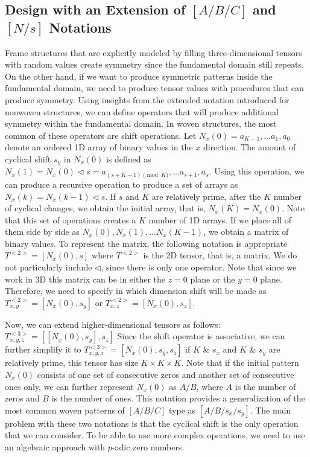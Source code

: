 \documentclass[times,twocolumn,final]{elsarticle}
\begin{document}
\subsection{Design with an Extension of $[A/B/C]$ and $[N/s]$ Notations}
\label{Subsec_Design_ABC}

Frame structures that are explicitly modeled by filling three-dimensional tensors with random values create symmetry since the fundamental domain still repeats. On the other hand, if we want to produce symmetric patterns inside the fundamental domain, we need to produce tensor values with procedures that can produce symmetry. Using insights from the extended notation introduced for nonwoven structures, we can define operators that will produce additional symmetry within the fundamental domain. In woven structures, the most common of these operators are shift operations. Let $N_x(0) = {a_{K-1},\ldots a_1, a_0}$ denote an ordered 1D array of binary values in the $x$ direction. The amount of cyclical shift $s_y$ in $N_x(0)$ is defined as $ N_x(1) = N_x(0) \triangleleft s = {a_{(s+K-1)\pmod{K}},\ldots a_{s+1}, a_s}$. Using this operation, we can produce a recursive operation to produce a set of arrays as $ N_x(k) =N_x({k-1}) \triangleleft s$. If $s$ and $K$ are relatively prime, after the $K$ number of cyclical changes, we obtain the initial array, that is, $N_x(K)=N_x(0)$. Note that this set of operations creates a $K$ number of 1D arrays. If we place all of them side by side as ${N_x(0),N_x(1),\ldots N_x(K-1)}$, we obtain a matrix of binary values. To represent the matrix, the following notation is appropriate
$ T^{<2>} = [N_x(0),s]$
where $T^{<2>}$ is the 2D tensor, that is, a matrix. We do not particularly include $\triangleleft$, since there is only one operator. Note that since we work in 3D this matrix can be in either the $z = 0$ plane or the $y = 0$ plane. Therefore, we need to specify in which dimension shift will be made as $ T_{x,y}^{<2>} = [N_x(0),s_y]$ or $ T_{x,z}^{<2>}  = [N_x(0),s_z]$. 

Now, we can extend higher-dimensional tensors as follows: $ T_{x,y,z}^{<3>} = [[N_x(0), s_y], s_z]$
Since the shift operator is associative, we can further simplify it to
$ T_{x,y,z}^{<3>} = [N_x(0), s_y, s_z]$
if $K$ \& $s_x$ and $K$ \& $s_y$ are relatively prime, this tensor has size $K \times K \times K$. Note that if the initial pattern $N_x(0)$ consists of one set of consecutive zeros and another set of consecutive ones only, we can further represent $N_x(0)$ as $A/B$, where $A$ is the number of zeros and $B$ is the number of ones. This notation provides a generalization of the most common woven patterns of $[A/B/C]$ type as $[A/B/s_x/s_y]$.
The main problem with these two notations is that the cyclical shift is the only operation that we can consider. To be able to use more complex operations, we need to use an algebraic approach with $p$-adic zero numbers. 
\end{document}
